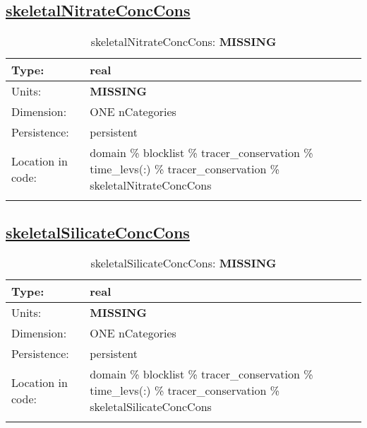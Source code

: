 \subsection[skeletalNitrateConcCons]{\hyperref[sec:var_tab_tracer_conservation]{skeletalNitrateConcCons}}
\label{subsec:var_sec_tracer_conservation_skeletalNitrateConcCons}
\begin{center}
\begin{longtable}{| p{2.0in} | p{4.0in} |}
        \hline 
        Type: & real \\
        \hline 
        Units: & {\bf \color{red} MISSING} \\
        \hline 
        Dimension: & ONE nCategories \\
        \hline 
        Persistence: & persistent \\
        \hline 
         Location in code: & domain \% blocklist \% tracer\_conservation \% time\_levs(:) \% tracer\_conservation \% skeletalNitrateConcCons \\
         \hline 
    \caption{skeletalNitrateConcCons: {\bf \color{red} MISSING}}
\end{longtable}
\end{center}
\subsection[skeletalSilicateConcCons]{\hyperref[sec:var_tab_tracer_conservation]{skeletalSilicateConcCons}}
\label{subsec:var_sec_tracer_conservation_skeletalSilicateConcCons}
\begin{center}
\begin{longtable}{| p{2.0in} | p{4.0in} |}
        \hline 
        Type: & real \\
        \hline 
        Units: & {\bf \color{red} MISSING} \\
        \hline 
        Dimension: & ONE nCategories \\
        \hline 
        Persistence: & persistent \\
        \hline 
         Location in code: & domain \% blocklist \% tracer\_conservation \% time\_levs(:) \% tracer\_conservation \% skeletalSilicateConcCons \\
         \hline 
    \caption{skeletalSilicateConcCons: {\bf \color{red} MISSING}}
\end{longtable}
\end{center}
